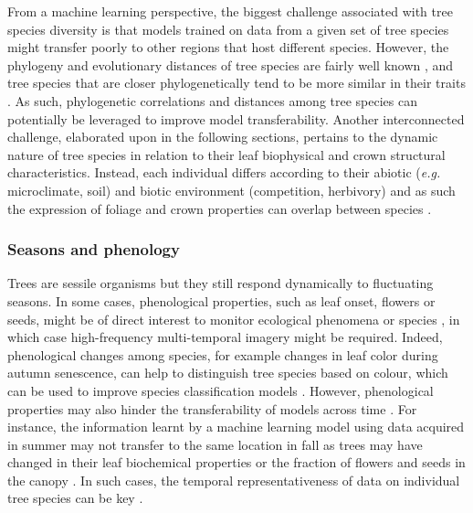 \documentclass{CUP-JNL-DTM}%
\theoremstyle{definition}
\numberwithin{equation}{section}
\begin{document}
From a machine learning perspective, the biggest challenge associated with tree species diversity is that models trained on data from a given set of tree species might transfer poorly to other regions that host different species. However, the phylogeny and evolutionary distances of tree species are fairly well known \cite{zanne_three_2014}, and tree species that are closer phylogenetically tend to be more similar in their traits \cite{ackerly_conservatism_2009}. As such, phylogenetic correlations and distances among tree species can potentially be leveraged to improve model transferability.
Another interconnected challenge, elaborated upon in the following sections, pertains to the dynamic nature of tree species in relation to their leaf biophysical and crown structural characteristics.
Instead, each individual differs according to their abiotic (\textit{e.g.} microclimate, soil) and biotic environment (competition, herbivory) and as such the expression of foliage and crown properties can overlap between species \citep{fassnacht_review_2016}.


\subsubsection{Seasons and phenology}
\label{sec:challenge_phenology}

Trees are sessile organisms but they still respond dynamically to fluctuating seasons. In some cases, phenological properties, such as leaf onset, flowers or seeds, might be  of direct interest to monitor ecological phenomena or species \cite{wagner_flowering_2021}, in which case high-frequency multi-temporal imagery might be required. Indeed, phenological changes among species, for example changes in leaf color during autumn senescence, can help to distinguish tree species based on colour, which can be used to improve species classification models \cite{cloutier_influence_2023}. However, phenological properties may also hinder the transferability of models across time \citep{kattenborn_spatially_2022}. 
For instance, the information learnt by a machine learning model using data acquired in summer may not transfer to the same location in fall as trees may have changed in their leaf biochemical properties or the fraction of flowers and seeds in the canopy  \cite{schiefer_retrieval_2021}. 
In such cases, the temporal representativeness of data on individual tree species can be key \cite{kattenborn_spatially_2022}.
\end{document}
